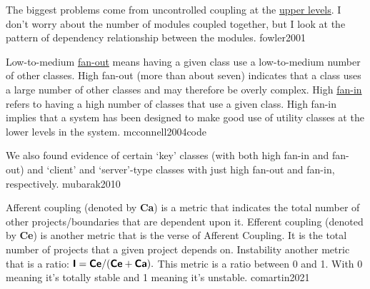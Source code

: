 \documentclass{article}
\begin{document}
  {The biggest problems come from uncontrolled coupling at the \ul{upper levels}. I don't worry about the number of modules coupled together, but I look at the pattern of dependency relationship between the modules.}
  {fowler2001}

  {Low-to-medium \ul{fan-out} means having a given class use a low-to-medium number of other classes. High fan-out (more than about seven) indicates that a class uses a large number of other classes and may therefore be overly complex. High \ul{fan-in} refers to having a high number of classes that use a given class. High fan-in implies that a system has been designed to make good use of utility classes at the lower levels in the system.}
  {mcconnell2004code}



  {We also found evidence of certain `key' classes (with both high fan-in and fan-out) and `client' and `server'-type classes with just high fan-out and fan-in, respectively.}
  {mubarak2010}


  {Afferent coupling (denoted by \textbf{\textsf{Ca}}) is a metric that indicates the total number of other projects/boundaries that are dependent upon it. Efferent coupling (denoted by \textbf{\textsf{Ce}}) is another metric that is the verse of Afferent Coupling. It is the total number of projects that a given project depends on. Instability another metric that is a ratio: $\textbf{\textsf{I}} = \textbf{\textsf{Ce}} / (\textbf{\textsf{Ce}} + \textbf{\textsf{Ca}}).$ This metric is a ratio between 0 and 1. With 0 meaning it's totally stable and 1 meaning it's unstable.}
  {comartin2021}
\end{document}
